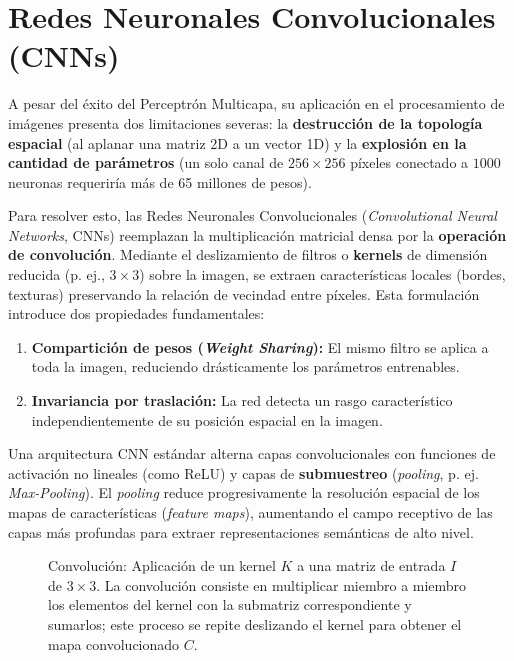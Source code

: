 \section{Redes Neuronales Convolucionales (CNNs)}

A pesar del éxito del Perceptrón Multicapa, su aplicación en el procesamiento de imágenes presenta dos limitaciones severas: la \textbf{destrucción de la topología espacial} (al aplanar una matriz 2D a un vector 1D) y la \textbf{explosión en la cantidad de parámetros} (un solo canal de $256 \times 256$ píxeles conectado a $1000$ neuronas requeriría más de 65 millones de pesos).

Para resolver esto, las Redes Neuronales Convolucionales (\textit{Convolutional Neural Networks}, CNNs) reemplazan la multiplicación matricial densa por la \textbf{operación de convolución}. Mediante el deslizamiento de filtros o \textbf{kernels} de dimensión reducida (p. ej., $3 \times 3$) sobre la imagen, se extraen características locales (bordes, texturas) preservando la relación de vecindad entre píxeles. Esta formulación introduce dos propiedades fundamentales:

\begin{enumerate}
    \item \textbf{Compartición de pesos (\textit{Weight Sharing}):} El mismo filtro se aplica a toda la imagen, reduciendo drásticamente los parámetros entrenables.
    \item \textbf{Invariancia por traslación:} La red detecta un rasgo característico independientemente de su posición espacial en la imagen.
\end{enumerate}

Una arquitectura CNN estándar alterna capas convolucionales con funciones de activación no lineales (como ReLU) y capas de \textbf{submuestreo} (\textit{pooling}, p. ej. \textit{Max-Pooling}). El \textit{pooling} reduce progresivamente la resolución espacial de los mapas de características (\textit{feature maps}), aumentando el campo receptivo de las capas más profundas para extraer representaciones semánticas de alto nivel.


\begin{figure}[H]
    \centering
    \resizebox{0.76\textwidth}{!}{%
    }%
    \caption{Convolución: Aplicación de un kernel $K$ a una matriz de entrada $I$ de $3 \times 3$. La convolución consiste en multiplicar miembro a miembro los elementos del kernel con la submatriz correspondiente y sumarlos; este proceso se repite deslizando el kernel para obtener el mapa convolucionado $C$.}
    \label{fig:kernel_conv}
\end{figure}


